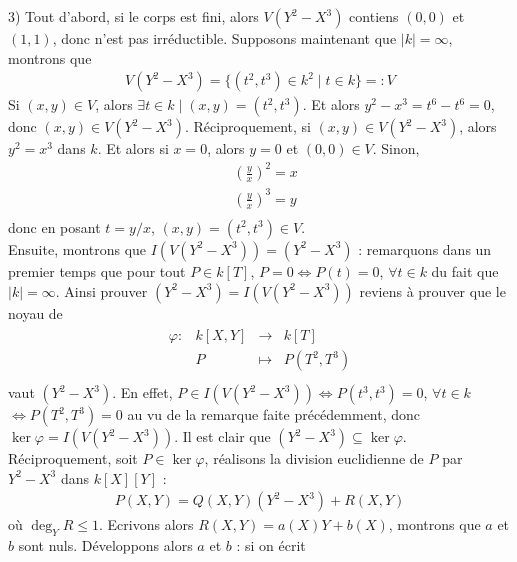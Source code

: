         \begin{question}{3)}
            Tout d'abord, si le corps est fini, alors $V(Y^2 - X^3)$ contiens $(0,0)$ et $(1,1)$, donc n'est pas irréductible. Supposons maintenant que $|k| = \infty$, montrons que
            \begin{align*}
                V(Y^2 - X^3) = \{(t^2, t^3) \in k^2 \mid t \in k\} =: V
            \end{align*}
            Si $(x,y) \in V$, alors $\exists t \in k \mid (x,y) = (t^2, t^3)$. Et alors $y^2 - x^3 = t^6 - t^6 = 0$, donc $(x,y) \in V(Y^2 - X^3)$. Réciproquement, si $(x,y) \in V(Y^2 - X^3)$, alors $y^2 = x^3$ dans $k$. Et alors si $x = 0$, alors $y = 0$ et $(0,0) \in V$. Sinon,
            \begin{align*}
                &\left(\frac{y}{x}\right)^2 = x \\
                &\left(\frac{y}{x}\right)^3 = y \\
            \end{align*}
            donc en posant $t = y/x$, $(x,y) = (t^2, t^3) \in V$. \\
            Ensuite, montrons que $I(V(Y^2 - X^3)) = (Y^2 - X^3)$ : remarquons dans un premier temps que pour tout $P \in k[T]$, $P = 0 \iff P(t) = 0$, $\forall t \in k$ du fait que $|k| = \infty$. Ainsi prouver $(Y^2 - X^3) = I(V(Y^2 - X^3))$ reviens à prouver que le noyau de
            \begin{align*}
                \begin{array}{cccc}
                    \varphi : & k[X,Y] & \to & k[T] \\
                    & P & \mapsto & P(T^2,T^3) \\
                \end{array}
            \end{align*}
            vaut $(Y^2 - X^3)$. En effet, $P \in I(V(Y^2 - X^3)) \iff P(t^3, t^3) = 0$, $\forall t \in k$ $\iff P(T^2, T^3) = 0$ au vu de la remarque faite précédemment, donc $\ker \varphi = I(V(Y^2 - X^3))$. Il est clair que $(Y^2 - X^3) \subseteq \ker \varphi$. Réciproquement, soit $P \in \ker \varphi$, réalisons la division euclidienne de $P$ par $Y^2 - X^3$ dans $k[X][Y]$ :
            \begin{align*}
                P(X,Y) = Q(X,Y)(Y^2 - X^3) + R(X,Y)
            \end{align*}
            où $\deg_Y R \leq 1$. Ecrivons alors $R(X,Y) = a(X)Y + b(X)$, montrons que $a$ et $b$ sont nuls. Développons alors $a$ et $b$ : si on écrit 

\end{question}
